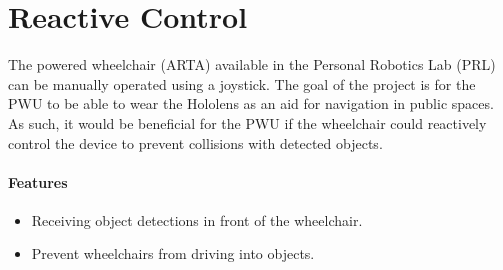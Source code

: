 \section{Reactive Control} \label{sec:reactive}
The powered wheelchair (ARTA) available in the Personal Robotics Lab (PRL) can be manually operated using a joystick. The goal of the project is for the PWU to be able to wear the Hololens as an aid for navigation in public spaces. As such, it would be beneficial for the PWU if the wheelchair could reactively control the device to prevent collisions with detected objects.

\paragraph{Features}
\begin{itemize}
    \item Receiving object detections in front of the wheelchair.
    \item Prevent wheelchairs from driving into objects.
\end{itemize}
